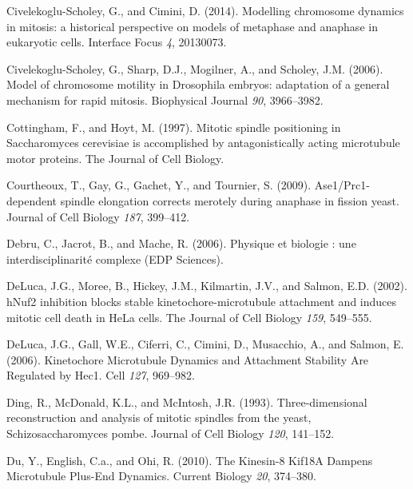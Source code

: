\documentclass[12pt,a4paper,twoside,openright]{book}
\begin{document}
Civelekoglu-Scholey, G., and Cimini, D. (2014). Modelling chromosome
dynamics in mitosis: a historical perspective on models of metaphase and
anaphase in eukaryotic cells. Interface Focus \emph{4}, 20130073.

Civelekoglu-Scholey, G., Sharp, D.J., Mogilner, A., and Scholey, J.M.
(2006). Model of chromosome motility in Drosophila embryos: adaptation
of a general mechanism for rapid mitosis. Biophysical Journal \emph{90},
3966--3982.

Cottingham, F., and Hoyt, M. (1997). Mitotic spindle positioning in
Saccharomyces cerevisiae is accomplished by antagonistically acting
microtubule motor proteins. The Journal of Cell Biology.

Courtheoux, T., Gay, G., Gachet, Y., and Tournier, S. (2009).
Ase1/Prc1-dependent spindle elongation corrects merotely during anaphase
in fission yeast. Journal of Cell Biology \emph{187}, 399--412.

Debru, C., Jacrot, B., and Mache, R. (2006). Physique et biologie : une
interdisciplinarité complexe (EDP Sciences).

DeLuca, J.G., Moree, B., Hickey, J.M., Kilmartin, J.V., and Salmon, E.D.
(2002). hNuf2 inhibition blocks stable kinetochore-microtubule
attachment and induces mitotic cell death in HeLa cells. The Journal of
Cell Biology \emph{159}, 549--555.

DeLuca, J.G., Gall, W.E., Ciferri, C., Cimini, D., Musacchio, A., and
Salmon, E. (2006). Kinetochore Microtubule Dynamics and Attachment
Stability Are Regulated by Hec1. Cell \emph{127}, 969--982.

Ding, R., McDonald, K.L., and McIntosh, J.R. (1993). Three-dimensional
reconstruction and analysis of mitotic spindles from the yeast,
Schizosaccharomyces pombe. Journal of Cell Biology \emph{120}, 141--152.

Du, Y., English, C.a., and Ohi, R. (2010). The Kinesin-8 Kif18A Dampens
Microtubule Plus-End Dynamics. Current Biology \emph{20}, 374--380.
\end{document}
